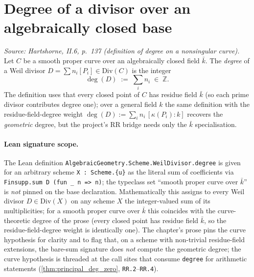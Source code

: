 \section{Degree of a divisor over an algebraically closed base}
\begin{definition}
  \label{def:divisor_degree}
  
  \textit{Source: Hartshorne, II.6, p.~137 (definition of degree on a
  nonsingular curve).}
  Let \(C\) be a smooth proper curve over an algebraically closed field
  \(\bar k\). The \emph{degree} of a Weil divisor $D = \sum n_i [P_i] \in
  \mathrm{Div}(C)$ is the integer
  \[
    \deg(D) \;:=\; \sum_i n_i \;\in\; \mathbb Z.
  \]
  The definition uses that every closed point of \(C\) has residue field
  \(\bar k\) (so each prime divisor contributes degree one); over a general
  field \(k\) the same definition with the residue-field-degree weight
  \(\deg(D) := \sum_i n_i \, [\kappa(P_i) : k]\) recovers the
  \emph{geometric} degree, but the project's RR bridge needs only the
  \(\bar k\) specialisation.
  \paragraph{Lean signature scope.} The Lean definition
  \texttt{AlgebraicGeometry.Scheme.WeilDivisor.degree} is given for an
  arbitrary scheme \texttt{X : Scheme.\{u\}} as the literal sum of
  coefficients via \texttt{Finsupp.sum D (fun \_ n => n)}; the typeclass
  set ``smooth proper curve over \(\bar k\)'' is \emph{not} pinned on the
  base declaration. Mathematically this assigns to every Weil divisor
  \(D \in \mathrm{Div}(X)\) on any scheme \(X\) the integer-valued sum of its
  multiplicities; for a smooth proper curve over \(\bar k\) this coincides
  with the curve-theoretic degree of the prose (every closed point has
  residue field \(\bar k\), so the residue-field-degree weight is identically
  one). The chapter's prose pins the curve hypothesis for clarity and to
  flag that, on a scheme with non-trivial residue-field extensions, the
  bare-sum signature does \emph{not} compute the geometric degree; the
  curve hypothesis is threaded at the call sites that consume
  \texttt{degree} for arithmetic statements
  (\ref{thm:principal_deg_zero}, \texttt{RR.2}--\texttt{RR.4}).
\end{definition}

